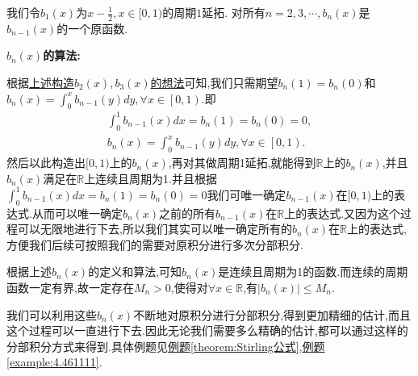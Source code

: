 \documentclass[lang=cn,newtx,10pt,scheme=chinese]{elegantbook}
\begin{document}
\begin{definition}[\(b_n(x)\)定义和算法]\label{definition:b_n(x)定义和算法}
我们令\(b_1(x)\)为\(x-\frac{1}{2},x\in[0,1)\)的周期\(1\)延拓. 对所有\(n=2,3,\cdots,b_n(x)\)是\(b_{n - 1}(x)\)的一个原函数.
\end{definition}
\begin{note}
\textbf{\(b_n(x)\)的算法:}

根据\hyperlink{remark:利用0阶E-M公式精细估阶的构造}{上述构造$b_2(x),b_3(x)$的想法}可知,我们只需期望\(b_n(1)=b_n(0)\)和$b_n(x)=\int_0^x{b_{n-1}\left( y \right) dy},\forall x\in \left[ 0,1 \right) $.即
\begin{gather*}
\int_{0}^{1}b_{n-1}(x)dx =b_n(1)=b_n(0)= 0,
\\
b_n(x)=\int_0^x{b_{n-1}\left( y \right) dy},\forall x\in \left[ 0,1 \right).
\end{gather*}
然后以此构造出$[0,1)$上的$b_n(x)$,再对其做周期1延拓,就能得到$\mathbb{R}$上的$b_n(x)$,并且$b_n(x)$满足在$\mathbb{R}$上连续且周期为1.并且根据$\int_{0}^{1}b_{n-1}(x)dx =b_n(1)=b_n(0)= 0$我们可唯一确定\(b_{n-1}(x)\)在\([0,1)\)上的表达式.从而可以唯一确定$b_n(x)$之前的所有\(b_{n-1}(x)\)在\(\mathbb{R}\)上的表达式.又因为这个过程可以无限地进行下去,所以我们其实可以唯一确定所有的\(b_n(x)\)在\(\mathbb{R}\)上的表达式,方便我们后续可按照我们的需要对原积分进行多次分部积分.

根据上述$b_n(x)$的定义和算法,可知$b_n(x)$是连续且周期为1的函数.而连续的周期函数一定有界,故一定存在$M_n>0$,使得对$\forall x\in \mathbb{R}$,有$\left| b_n(x) \right|\leqslant M_n$.
\end{note}
\begin{remark}
我们可以利用这些$b_n(x)$不断地对原积分进行分部积分,得到更加精细的估计,而且这个过程可以一直进行下去.因此无论我们需要多么精确的估计,都可以通过这样的分部积分方式来得到.具体例题见\hyperref[theorem:Stirling公式]{例题\ref{theorem:Stirling公式}},\hyperref[example:4.461111]{例题\ref{example:4.461111}}.
\end{remark}
\end{document}
